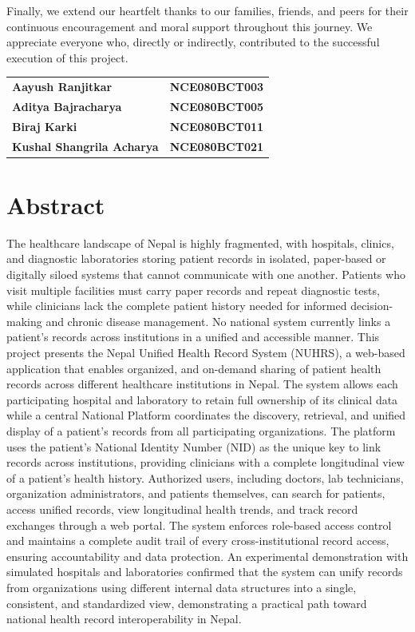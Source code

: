 \documentclass[12pt]{report}
\numberwithin{equation}{chapter}
\begin{document}
Finally, we extend our heartfelt thanks to our families, friends, and peers for their continuous encouragement and moral support throughout this journey. We appreciate everyone who, directly or indirectly, contributed to the successful execution of this project.

\vspace{1cm}
\noindent
\begin{tabular}{@{}ll@{}}
\textbf{Aayush Ranjitkar}    & \textbf{NCE080BCT003}\\
\textbf{Aditya Bajracharya}  & \textbf{NCE080BCT005}\\
\textbf{Biraj Karki}         & \textbf{NCE080BCT011}\\
\textbf{Kushal Shangrila Acharya}      & \textbf{NCE080BCT021}\\
\end{tabular}

\newpage

\chapter*{Abstract}
The healthcare landscape of Nepal is highly fragmented, with hospitals, clinics, and diagnostic laboratories storing patient records in isolated, paper-based or digitally siloed systems that cannot communicate with one another. Patients who visit multiple facilities must carry paper records and repeat diagnostic tests, while clinicians lack the complete patient history needed for informed decision-making and chronic disease management. No national system currently links a patient's records across institutions in a unified and accessible manner. This project presents the Nepal Unified Health Record System (NUHRS), a web-based application that enables organized, and on-demand sharing of patient health records across different healthcare institutions in Nepal. The system allows each participating hospital and laboratory to retain full ownership of its clinical data while a central National Platform coordinates the discovery, retrieval, and unified display of a patient's records from all participating organizations. The platform uses the patient's National Identity Number (NID) as the unique key to link records across institutions, providing clinicians with a complete longitudinal view of a patient's health history. Authorized users, including doctors, lab technicians, organization administrators, and patients themselves, can search for patients, access unified records, view longitudinal health trends, and track record exchanges through a web portal. The system enforces role-based access control and maintains a complete audit trail of every cross-institutional record access, ensuring accountability and data protection. An experimental demonstration with simulated hospitals and laboratories confirmed that the system can unify records from organizations using different internal data structures into a single, consistent, and standardized view, demonstrating a practical path toward national health record interoperability in Nepal.
\end{document}
